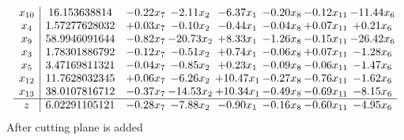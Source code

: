 \documentclass[8pt]{article}
\begin{document}
\[\begin{array}{c| c c@{\hskip 2pt} c@{\hskip 2pt} c@{\hskip 2pt} c@{\hskip 2pt} c@{\hskip 2pt} c@{\hskip 2pt} }
 x_{10}   &  16.153638814 & -0.22 x_{7} & -2.11 x_{2} & -6.37 x_{1} & -0.20 x_{8} & -0.12 x_{11} & -11.44 x_{6}\\
 x_{4}   &  1.57277628032 & +  0.03 x_{7} & -0.10 x_{2} & -0.44 x_{1} & -0.04 x_{8} & +  0.07 x_{11} & +  0.21 x_{6}\\
 x_{9}   &  58.9946091644 & -0.82 x_{7} & -20.73 x_{2} & +  8.33 x_{1} & -1.26 x_{8} & -0.15 x_{11} & -26.42 x_{6}\\
 x_{3}   &  1.78301886792 & -0.12 x_{7} & -0.51 x_{2} & +  0.74 x_{1} & -0.06 x_{8} & +  0.07 x_{11} & -1.28 x_{6}\\
 x_{5}   &  3.47169811321 & -0.04 x_{7} & -0.85 x_{2} & +  0.23 x_{1} & -0.09 x_{8} & -0.06 x_{11} & -1.47 x_{6}\\
 x_{12}   &  11.7628032345 & +  0.06 x_{7} & -6.26 x_{2} & + 10.47 x_{1} & -0.27 x_{8} & -0.76 x_{11} & -1.62 x_{6}\\
 x_{13}   &  38.0107816712 & -0.37 x_{7} & -14.53 x_{2} & + 10.34 x_{1} & -0.49 x_{8} & -0.69 x_{11} & -8.15 x_{6}\\
\hline
z    &  6.02291105121 & -0.28 x_{7} & -7.88 x_{2} & -0.90 x_{1} & -0.16 x_{8} & -0.60 x_{11} & -4.95 x_{6}\\
\end{array}\]
 After cutting plane is added 
\end{document}
